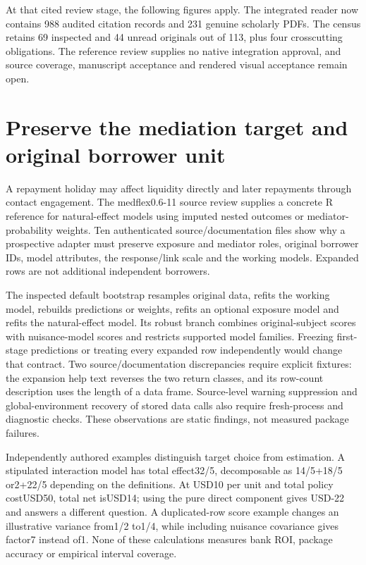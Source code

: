At that cited review stage, the following figures apply. The integrated
reader now contains 988 audited citation records and 231 genuine
scholarly PDFs. The census retains 69 inspected and 44 unread originals
out of 113, plus four crosscutting obligations. The reference review
supplies no native integration approval, and source coverage, manuscript
acceptance and rendered visual acceptance remain open.
\citep{sp23gist_reader,sp23gist_progress}

\hypertarget{preserve-the-mediation-target-and-original-borrower-unit}{%
\section{Preserve the mediation target and original borrower
unit}\label{preserve-the-mediation-target-and-original-borrower-unit}}

A repayment holiday may affect liquidity directly and later repayments
through contact engagement. The medflex0.6-11 source review supplies a
concrete R reference for natural-effect models using imputed nested
outcomes or mediator-probability weights. Ten authenticated
source/documentation files show why a prospective adapter must preserve
exposure and mediator roles, original borrower IDs, model attributes,
the response/link scale and the working models. Expanded rows are not
additional independent borrowers. \citep{exec23_medflex_sources}

The inspected default bootstrap resamples original data, refits the
working model, rebuilds predictions or weights, refits an optional
exposure model and refits the natural-effect model. Its robust branch
combines original-subject scores with nuisance-model scores and
restricts supported model families. Freezing first-stage predictions or
treating every expanded row independently would change that contract.
Two source/documentation discrepancies require explicit fixtures: the
expansion help text reverses the two return classes, and its row-count
description uses the length of a data frame. Source-level warning
suppression and global-environment recovery of stored data calls also
require fresh-process and diagnostic checks. These observations are
static findings, not measured package failures.
\citep{exec23_medflex_sources}

Independently authored examples distinguish target choice from
estimation. A stipulated interaction model has total effect32/5,
decomposable as 14/5+18/5 or2+22/5 depending on the definitions. At
USD10 per unit and total policy costUSD50, total net isUSD14; using the
pure direct component gives USD-22 and answers a different question. A
duplicated-row score example changes an illustrative variance from1/2
to1/4, while including nuisance covariance gives factor7 instead of1.
None of these calculations measures bank ROI, package accuracy or
empirical interval coverage. \citep{exec23_medflex_reference}

